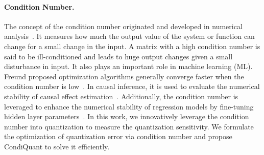 \vspace{-4mm}
\paragraph{Condition Number.}
The concept of the condition number originated and developed in numerical analysis~\cite{turing1948rounding, neumann1947numerical}.
It measures how much the output value of the system or function can change for a small change in the input.
A matrix with a high condition number is said to be ill-conditioned and leads to huge output changes given a small disturbance in input. 
It also plays an important role in machine learning (ML).
Freund proposed optimization algorithms generally converge faster when the condition number is low~\cite{freund2018condition}.
In causal inference, it is used to evaluate the numerical stability of causal effect estimation~\cite{spencer2021condition}.
Additionally, the condition number is leveraged to enhance the numerical stability of regression models by fine-tuning hidden layer parameters~\cite{xiao2018dynamical}.
In this work, we innovatively leverage the condition number into quantization to measure the quantization sensitivity.
We formulate the optimization of quantization error via condition number and propose CondiQuant to solve it efficiently.

\vspace{-2mm}